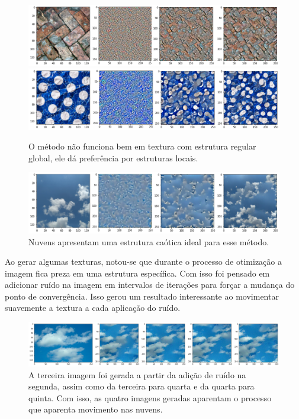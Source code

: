\begin{figure}[!ht]
	\centering
	\includegraphics[width=\linewidth]{files/assets/results/result1.png}
	\includegraphics[width=\linewidth]{files/assets/results/result3.png}
	\caption{O método não funciona bem em textura com 
	estrutura regular global, ele dá preferência por
	estruturas locais. }
	\label{img:preview}
\end{figure}



\begin{figure}[!ht]
	\centering
	\includegraphics[width=\linewidth]{files/assets/results/result4.png}
	\caption{Nuvens apresentam uma estrutura caótica
	ideal para esse método.}
	\label{img:preview}
\end{figure}

Ao gerar algumas texturas, notou-se que durante
o processo de otimização a imagem fica preza em 
uma estrutura específica. Com isso foi pensado
em adicionar ruído na imagem em intervalos de iterações
para forçar a mudança do ponto de convergência.
Isso gerou um resultado interessante ao movimentar
suavemente a textura a cada aplicação do ruído.

\begin{figure}[!ht]
	\centering
	\includegraphics[width=\linewidth]{files/assets/results/result6.png}
	\caption{A terceira imagem foi gerada a partir da adição de ruído
		na segunda, assim como da terceira para quarta e da quarta para
		quinta. 
		Com isso, as quatro imagens geradas aparentam o processo
	que aparenta movimento nas nuvens.}
	\label{img:preview}
\end{figure}

